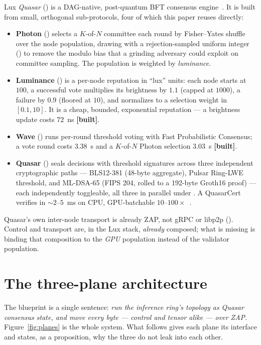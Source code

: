 \documentclass[11pt]{article}
\newcommand{\built}{\textcolor{str}{\small\textbf{[built]}}}
\begin{document}
Lux \emph{Quasar} () is a DAG-native, post-quantum BFT
consensus engine~\cite{quasar,luxconsensus}. It is built from small, orthogonal sub-protocols,
four of which this paper reuses directly:
\begin{itemize}[leftmargin=1.4em,itemsep=2pt]
\item \textbf{Photon} () selects a $K$-of-$N$ committee each round by
Fisher--Yates shuffle over the node population, drawing with a rejection-sampled uniform integer
() to remove the modulo bias that a grinding adversary could exploit on
committee sampling. The population is weighted by \emph{luminance}.
\item \textbf{Luminance} () is a per-node reputation in ``lux'' units:
each node starts at $100$, a successful vote multiplies its brightness by $1.1$ (capped at
$1000$), a failure by $0.9$ (floored at $10$), and  normalizes to a selection
weight in $[0.1, 10]$. It is a cheap, bounded, exponential reputation --- a brightness update
costs $72$~ns \built{}.
\item \textbf{Wave} () runs per-round threshold voting with Fast
Probabilistic Consensus; a vote round costs $3.38$~\textmu s and a $K$-of-$N$ Photon selection
$3.03$~\textmu s \built{}.
\item \textbf{Quasar} () seals decisions with threshold signatures across
three independent cryptographic paths --- BLS12-381 (48-byte aggregate), Pulsar Ring-LWE
threshold, and ML-DSA-65 (FIPS 204, rolled to a 192-byte Groth16 proof) --- each independently
toggleable, all three in parallel under . A QuasarCert verifies in
$\sim$$2$--$5$~ms on CPU, GPU-batchable $10$--$100\times$~\cite{luxconsensus}.
\end{itemize}
Quasar's own inter-node transport is already ZAP, not gRPC or libp2p ().
Control and transport are, in the Lux stack, \emph{already} composed; what is missing is binding
that composition to the \emph{GPU} population instead of the validator population.

\section{The three-plane architecture}
\label{sec:planes}

The blueprint is a single sentence: \emph{run the inference ring's topology as Quasar consensus
state, and move every byte --- control and tensor alike --- over ZAP.} Figure~\ref{fig:planes}
is the whole system. What follows gives each plane its interface and states, as a proposition,
why the three do not leak into each other.
\end{document}
